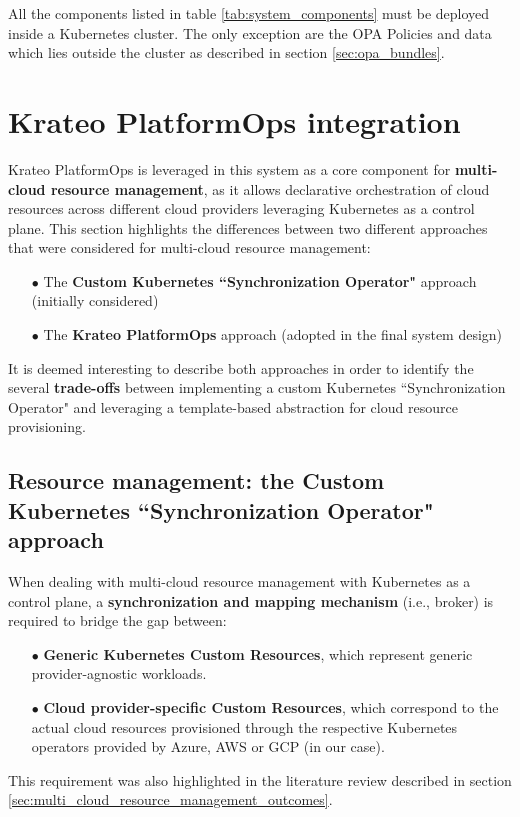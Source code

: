 All the components listed in table \ref{tab:system_components} must be deployed inside a Kubernetes cluster. The only exception are the OPA Policies and data which lies outside the cluster as described in section \ref{sec:opa_bundles}.

\section{Krateo PlatformOps integration}
\label{sec:krateo_integration}

Krateo PlatformOps is leveraged in this system as a core component for \textbf{multi-cloud resource management}, as it allows declarative orchestration of cloud resources across different cloud providers leveraging Kubernetes as a control plane. 
This section highlights the differences between two different approaches that were considered for multi-cloud resource management:
\begin{itemize}[itemsep=0.2pt, topsep=1pt]
  \item[$\bullet$] The \textbf{Custom Kubernetes ``Synchronization Operator"} approach (initially considered)
  \item[$\bullet$] The \textbf{Krateo PlatformOps} approach (adopted in the final system design) \\
\end{itemize}

It is deemed interesting to describe both approaches in order to identify the several \textbf{trade-offs} between implementing a custom Kubernetes ``Synchronization Operator" and leveraging a template-based abstraction for cloud resource provisioning.

\subsection{Resource management: the Custom Kubernetes ``Synchronization Operator" approach}

When dealing with multi-cloud resource management with Kubernetes as a control plane, a \textbf{synchronization and mapping mechanism} (i.e., broker) is required to bridge the gap between:
\begin{itemize}[itemsep=0.2pt, topsep=1pt]
  \item[$\bullet$] \textbf{Generic Kubernetes Custom Resources}, which represent generic provider-agnostic workloads.
  \item[$\bullet$] \textbf{Cloud provider-specific Custom Resources}, which correspond to the actual cloud resources provisioned through the respective Kubernetes operators provided by Azure, AWS or GCP (in our case).
\end{itemize}
This requirement was also highlighted in the literature review described in section \ref{sec:multi_cloud_resource_management_outcomes}.

